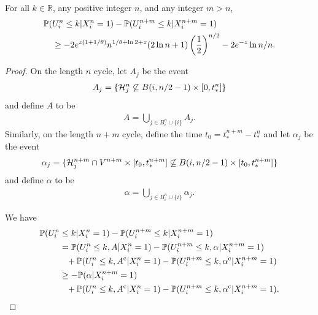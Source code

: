 	\begin{lemma}
	\label{lem: U converges}
	For all $k \in \mathbb{R}$, any positive integer $n$, and any integer $m > n$,
		\begin{align}
			\mathbb{P}(&U_i^n \leq k | X_i^n = 1) - \mathbb{P}(U_i^{n+m} \leq k | X_i^{n+m} = 1) \notag \\
			&\geq - 2 e^{z(1 + 1/\theta)} n^{1/\theta + \ln 2+ z}(2\ln n + 1) \left(\frac{1}{2}\right)^{n/2} - 2 e^{-z} \ln n / n.
		\end{align}
	\end{lemma}
	\begin{proof}
		On the length $n$ cycle, let $A_j$ be the event
		\begin{align}
			A_j = \{\mathcal{H}_j^n \not \subseteq B(i, n/2 - 1) \times [0, t_*^n]\}
		\end{align}
		and define $A$ to be
		\begin{align}
			A = \bigcup_{j \in B_i^n \cup \{i\}} A_j.
		\end{align}
		Similarly, on the length $n+m$ cycle, define the time $t_0 = t_*^{n+m} - t_*^n$ and let $\alpha_j$ be the event
		\begin{align}
			\alpha_j = \{\mathcal{H}_j^{n+m} \cap V^{n+m} \times [t_0, t_*^{n+m}] \not \subseteq B(i, n/2 - 1) \times [t_0, t_*^{n+m}]\}
		\end{align}
		and define $\alpha$ to be
		\begin{align}
			\alpha = \bigcup_{j \in B_i^n \cup \{i\}} \alpha_j.
		\end{align}

		We have
		\begin{align}
			\mathbb{P}(U_i^n &\leq k | X_i^n = 1) - \mathbb{P}(U_i^{n+m} \leq k | X_i^{n+m} = 1) \notag \\ 
			&= \mathbb{P}(U_i^n \leq k, A | X_i^n = 1) - \mathbb{P}(U_i^{n+m} \leq k, \alpha | X_i^{n+m} = 1) \notag \\
			&\phantom{=} + \mathbb{P}(U_i^n \leq k, A^\mathrm{c} | X_i^n = 1) - \mathbb{P}(U_i^{n+m} \leq k, \alpha^\mathrm{c} | X_i^{n+m} = 1) \\
			&\geq -\mathbb{P}(\alpha | X_i^{n+m} = 1) \notag \\
			&\phantom{=} + \mathbb{P}(U_i^n \leq k, A^\mathrm{c} | X_i^n = 1) - \mathbb{P}(U_i^{n+m} \leq k, \alpha^\mathrm{c} | X_i^{n+m} = 1).
			\label{eq:split probs in U converge lemma}
		\end{align}


\end{proof}
